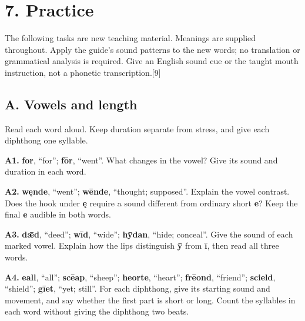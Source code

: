 \section*{7. Practice}

The following tasks are new teaching material. Meanings are supplied throughout. Apply the guide's sound patterns to the new words; no translation or grammatical analysis is required. Give an English sound cue or the taught mouth instruction, not a phonetic transcription.[9]

\subsection*{A. Vowels and length}

Read each word aloud. Keep duration separate from stress, and give each diphthong one syllable.

\textbf{A1.} \textbf{for}, “for”; \textbf{fōr}, “went”. What changes in the vowel? Give its sound and duration in each word.

\textbf{A2.} \textbf{węnde}, “went”; \textbf{wēnde}, “thought; supposed”. Explain the vowel contrast. Does the hook under \textbf{ę} require a sound different from ordinary short \textbf{e}? Keep the final \textbf{e} audible in both words.

\textbf{A3.} \textbf{dǣd}, “deed”; \textbf{wīd}, “wide”; \textbf{hȳdan}, “hide; conceal”. Give the sound of each marked vowel. Explain how the lips distinguish \textbf{ȳ} from \textbf{ī}, then read all three words.

\textbf{A4.} \textbf{eall}, “all”; \textbf{scēap}, “sheep”; \textbf{heorte}, “heart”; \textbf{frēond}, “friend”; \textbf{scield}, “shield”; \textbf{gīet}, “yet; still”. For each diphthong, give its starting sound and movement, and say whether the first part is short or long. Count the syllables in each word without giving the diphthong two beats.

